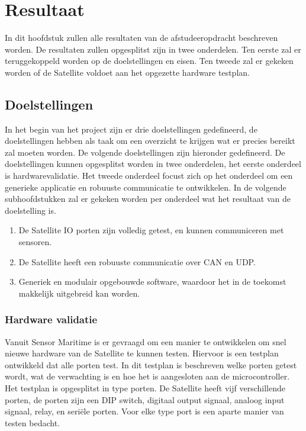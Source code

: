 \chapter{Resultaat}
In dit hoofdstuk zullen alle resultaten van de afstudeeropdracht beschreven worden. De resultaten zullen opgesplitst zijn in twee onderdelen. Ten eerste zal er teruggekoppeld worden op de doelstellingen en eisen. Ten tweede zal er gekeken worden of de Satellite voldoet aan het opgezette hardware testplan.

\section{Doelstellingen}
In het begin van het project zijn er drie doelstellingen gedefineerd, de doelstellingen hebben als taak om een overzicht te krijgen wat er precies bereikt zal moeten worden. De volgende doelstellingen zijn hieronder gedefineerd. De doelstellingen kunnen opgesplitst worden in twee onderdelen, het eerste onderdeel is hardwarevalidatie. Het tweede onderdeel focust zich op het onderdeel om een generieke applicatie en robuuste communicatie te ontwikkelen. In de volgende subhoofdstukken zal er gekeken worden per onderdeel wat het resultaat van de doelstelling is.
\begin{enumerate}
	\item De Satellite IO porten zijn volledig getest, en kunnen communiceren met sensoren.
	\item De Satellite heeft een robuuste communicatie over CAN en UDP.
	\item Generiek en modulair opgebouwde software, waardoor het in de toekomst makkelijk uitgebreid kan worden.
\end{enumerate}

\subsection{Hardware validatie}
Vanuit Sensor Maritime is er gevraagd om een manier te ontwikkelen om snel nieuwe hardware van de Satellite te kunnen testen. Hiervoor is een testplan ontwikkeld dat alle porten test. In dit testplan is beschreven welke porten getest wordt, wat de verwachting is en hoe het is aangesloten aan de microcontroller. Het testplan is opgesplitst in type porten. De Satellite heeft vijf verschillende porten, de porten zijn een DIP switch, digitaal output signaal, analoog input signaal, relay, en seriële porten. Voor elke type port is een aparte manier van testen bedacht. \newline

